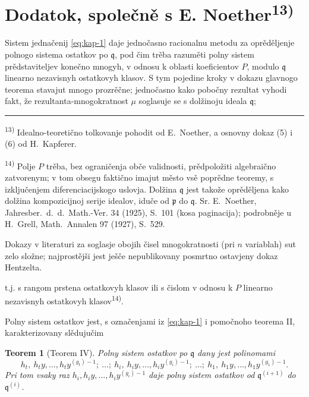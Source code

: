 \documentclass[11pt]{article}
\newcommand{\foreign}[1]{#1}
\theoremstyle{plain}
\newtheorem{satz}{Teorem}
\begin{document}
\newpage
\section*{Dodatok, společně s E. Noether\textsuperscript{13)}}

Sistem jednačenij \eqref{eq:kap-1} daje jednočasno racionalnu
metodu za oprěděljenje polnogo sistema ostatkov po $\mathfrak{q}$,
pod čim trěba razuměti polny sistem prědstaviteljev konečno mnogyh,
v odnosu k oblasti koeficientov $P$, modulo $\mathfrak{q}$ linearno
nezavisnyh ostatkovyh klasov. S tym pojedine kroky v dokazu
glavnogo teorema stavajut mnogo prozrěčne; jednočasno kako
pobočny rezultat vyhodi fakt, že rezultanta-mnogokratnost $\mu$
soglasuje se s dolžinoju ideala $\mathfrak{q}$;

\vspace{0.5em}
\noindent\rule{\textwidth}{0.4pt}
\vspace{0.3em}

{\footnotesize
\textsuperscript{13)} Idealno-teoretično tolkovanje pohodit od E.\ Noether, a osnovny
dokaz (5) i (6) od H.\ Kapferer.

\textsuperscript{14)} Polje $P$ trěba, bez ograničenja obče validnosti, prědpoložiti
algebraično zatvorenym; v tom obsegu faktično imajut město vsě poprědne
teoremy, s izključenjem diferenciacijskogo uslovja. Dolžina
$\mathfrak{q}$ jest takože oprěděljena kako dolžina kompozicijnoj
serije idealov, iduče od $\mathfrak{p}$ do $\mathfrak{q}$. Sr.
E.\ Noether, \foreign{Jahresber.\ d.\ d.\ Math.-Ver.} 34 (1925), S.~101
(kosa paginacija); podrobněje u H.\ Grell, \foreign{Math.\ Annalen} 97
(1927), S.~529.

Dokazy v literaturi za soglasje obojih čisel mnogokratnosti (pri
$n$ variablah) sut zelo složne; najprostějši jest ješče nepublikovany
posmrtno ostavjeny dokaz Hentzelta.
}

\vspace{1em}
t.j. s rangom prstena ostatkovyh klasov ili s čislom v odnosu k $P$
linearno nezavisnyh ostatkovyh klasov\textsuperscript{14)}.

Polny sistem ostatkov jest, s označenjami iz \eqref{eq:kap-1} i
pomočnoho teorema II, karakterizovany slědujučim

\begin{satz}[Teorem IV]\label{satz:kap-IV}
Polny sistem ostatkov po $\mathfrak{q}$ dany jest polinomami
\[
h_{t},\ h_{t}y,\ldots,h_{t}y^{(g_{t})-1};\ \ldots;\
h_{i},\ h_{i}y,\ldots,h_{i}y^{(g_{i})-1};\ \ldots;\
h_{1},\ h_{1}y,\ldots,h_{1}y^{(g_{1})-1}.
\]
Pri tom vsaky raz
$h_{i}, h_{i}y, \ldots, h_{i}y^{(g_{i})-1}$ daje polny
sistem ostatkov od $\mathfrak{q}^{(i+1)}$ do
$\mathfrak{q}^{(i)}$.
\end{satz}
\end{document}
